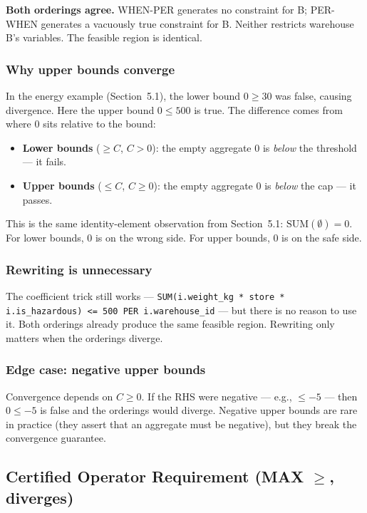 \documentclass[11pt]{article}
\begin{document}
\textbf{Both orderings agree.} WHEN-PER generates no constraint for B;
PER-WHEN generates a vacuously true constraint for B. Neither restricts
warehouse B's variables. The feasible region is identical.

\subsubsection*{Why upper bounds converge}

In the energy example (Section~5.1), the lower bound $0 \geq 30$ was false,
causing divergence. Here the upper bound $0 \leq 500$ is true. The
difference comes from where 0 sits relative to the bound:

\begin{itemize}[leftmargin=2em]
    \item \textbf{Lower bounds} ($\geq C$, $C > 0$): the empty aggregate 0 is
        \emph{below} the threshold --- it fails.
    \item \textbf{Upper bounds} ($\leq C$, $C \geq 0$): the empty aggregate 0 is
        \emph{below} the cap --- it passes.
\end{itemize}

This is the same identity-element observation from Section~5.1: $\text{SUM}(\emptyset) = 0$.
For lower bounds, 0 is on the wrong side. For upper bounds, 0 is on the safe side.

\subsubsection*{Rewriting is unnecessary}

The coefficient trick still works --- \texttt{SUM(i.weight\_kg * store *
i.is\_hazardous) <= 500 PER i.warehouse\_id} --- but there is no reason to
use it. Both orderings already produce the same feasible region. Rewriting
only matters when the orderings diverge.

\subsubsection*{Edge case: negative upper bounds}

Convergence depends on $C \geq 0$. If the RHS were negative --- e.g.,
$\leq -5$ --- then $0 \leq -5$ is false and the orderings would diverge.
Negative upper bounds are rare in practice (they assert that an aggregate
must be negative), but they break the convergence guarantee.

\subsection{Certified Operator Requirement (MAX $\geq$, diverges)}
\end{document}
